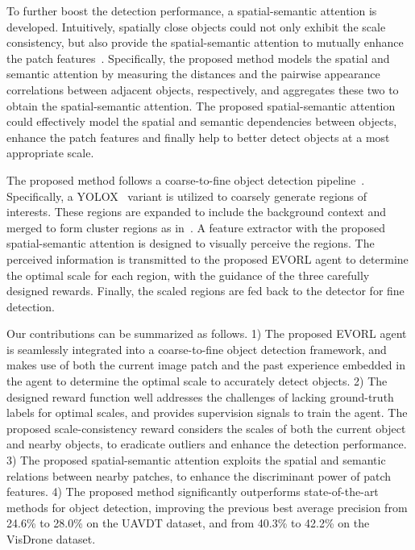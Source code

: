 \documentclass[letterpaper]{article} %
\begin{document}
To further boost the detection performance, a spatial-semantic attention is developed. Intuitively, spatially close objects could not only exhibit the scale consistency, but also provide the spatial-semantic attention to mutually enhance the patch features~\cite{he2023hierarchical,Zhang_2023_Spatial}. %
Specifically, the proposed method models the spatial and semantic attention by measuring the distances and the pairwise appearance correlations between adjacent objects, respectively, and aggregates these two to obtain the spatial-semantic attention. The proposed spatial-semantic attention could effectively model the spatial and semantic dependencies between objects, enhance the patch features and finally help to better detect objects at a most appropriate scale. 


The proposed method follows a coarse-to-fine object detection pipeline~\cite{Bouguettaya_2022_review}. Specifically, a YOLOX~\cite{Ge_2021_YOLOX} variant is utilized to coarsely generate regions of interests. These regions are expanded to include the background context and merged to form cluster regions as in~\cite{Huang_2022_UFPMP}. A feature extractor with the proposed spatial-semantic attention is designed to visually perceive the regions. The perceived information is transmitted to the proposed EVORL agent to determine the optimal scale for each region, with the guidance of the three carefully designed rewards. Finally, the scaled regions are fed back to the detector for fine detection. 


Our contributions can be summarized as follows. 1) The proposed EVORL agent is seamlessly integrated into a coarse-to-fine object detection framework, and makes use of both the current image patch and the past experience embedded in the agent to determine the optimal scale to accurately detect objects. 2) The designed reward function well addresses the challenges of lacking ground-truth labels for optimal scales, and provides supervision signals to train the agent. The proposed scale-consistency reward considers the scales of both the current object and nearby objects, to eradicate outliers and enhance the detection performance. 3) The proposed spatial-semantic attention exploits the spatial and semantic relations between nearby patches, to enhance the discriminant power of patch features. 4) The proposed method significantly outperforms state-of-the-art methods for object detection, improving the previous best average precision from 24.6\% to 28.0\% on the UAVDT dataset, and from 40.3\% to 42.2\% on the VisDrone dataset. 
\end{document}
